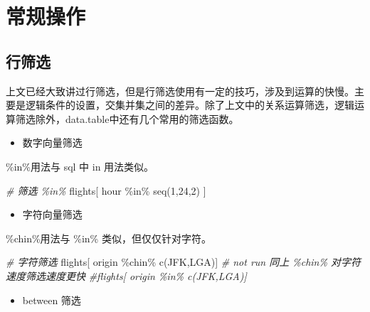 \documentclass[
]{book}
\newenvironment{Shaded}{\begin{snugshade}}{\end{snugshade}}
\newcommand{\CommentTok}[1]{\textcolor[rgb]{0.56,0.35,0.01}{\textit{#1}}}
\newcommand{\DecValTok}[1]{\textcolor[rgb]{0.00,0.00,0.81}{#1}}
\newcommand{\FunctionTok}[1]{\textcolor[rgb]{0.00,0.00,0.00}{#1}}
\newcommand{\NormalTok}[1]{#1}
\newcommand{\SpecialCharTok}[1]{\textcolor[rgb]{0.00,0.00,0.00}{#1}}
\newcommand{\StringTok}[1]{\textcolor[rgb]{0.31,0.60,0.02}{#1}}
\providecommand{\tightlist}{%
  \setlength{\itemsep}{0pt}\setlength{\parskip}{0pt}}
\begin{document}
\hypertarget{ux5e38ux89c4ux64cdux4f5c}{%
\section{常规操作}\label{ux5e38ux89c4ux64cdux4f5c}}

\hypertarget{ux884cux7b5bux9009}{%
\subsection{行筛选}\label{ux884cux7b5bux9009}}

上文已经大致讲过行筛选，但是行筛选使用有一定的技巧，涉及到运算的快慢。主要是逻辑条件的设置，交集并集之间的差异。除了上文中的关系运算筛选，逻辑运算筛选除外，data.table中还有几个常用的筛选函数。

\begin{itemize}
\tightlist
\item
  数字向量筛选
\end{itemize}

\%in\%用法与 sql 中 in 用法类似。

\begin{Shaded}
\begin{Highlighting}[]
\CommentTok{\# 筛选 \%in\% }
\NormalTok{flights[ hour }\SpecialCharTok{\%in\%} \FunctionTok{seq}\NormalTok{(}\DecValTok{1}\NormalTok{,}\DecValTok{24}\NormalTok{,}\DecValTok{2}\NormalTok{) ]}
\end{Highlighting}
\end{Shaded}

\begin{itemize}
\tightlist
\item
  字符向量筛选
\end{itemize}

\%chin\%用法与 \%in\% 类似，但仅仅针对字符。

\begin{Shaded}
\begin{Highlighting}[]
\CommentTok{\# 字符筛选}
\NormalTok{flights[ origin }\SpecialCharTok{\%chin\%} \FunctionTok{c}\NormalTok{(}\StringTok{\textquotesingle{}JFK\textquotesingle{}}\NormalTok{,}\StringTok{\textquotesingle{}LGA\textquotesingle{}}\NormalTok{)]}
\CommentTok{\# not run 同上 \%chin\% 对字符速度筛选速度更快}
\CommentTok{\#flights[ origin \%in\% c(\textquotesingle{}JFK\textquotesingle{},\textquotesingle{}LGA\textquotesingle{})]}
\end{Highlighting}
\end{Shaded}

\begin{itemize}
\tightlist
\item
  between 筛选
\end{itemize}
\end{document}
